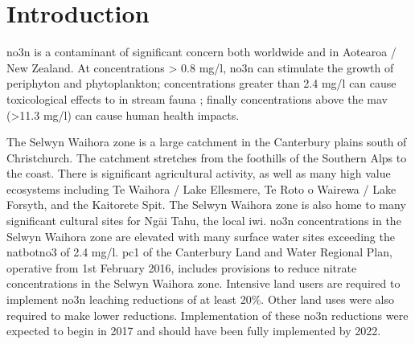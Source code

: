 
\section[Introduction]{Introduction} \label{sec:intro}

\gls{no3n} is a contaminant of significant concern both worldwide and in Aotearoa / New Zealand.
At concentrations > 0.8 mg/l, \gls{no3n} can stimulate the growth of periphyton and phytoplankton\citep{mcdowell_global_2020}; concentrations greater than 2.4 mg/l can cause toxicological effects to in stream fauna
\citep{camargo_nitrate_2005, horak_assessing_2019,wagenhoff_identifying_2017};
finally concentrations above the \gls{mav} (>11.3 mg/l) can cause human health impacts\citep{rahman_anthropogenic_2021}.

The Selwyn Waihora zone is a large catchment in the Canterbury plains south of Christchurch.
The catchment stretches from the foothills of the Southern Alps to the coast.
There is significant agricultural activity, as well as many high value ecosystems including Te Waihora / Lake Ellesmere, Te Roto o Wairewa / Lake Forsyth, and the Kaitorete Spit.
The Selwyn Waihora zone is also home to many significant cultural sites for Ngāi Tahu, the local iwi.
\gls{no3n} concentrations in the Selwyn Waihora zone are elevated with many surface water sites exceeding the \gls{natbotno3} of 2.4 mg/l\citep{noauthor_national_2020}.
\gls{pc1} of the Canterbury Land and Water Regional Plan, operative from 1st February 2016, includes provisions to reduce nitrate concentrations in the Selwyn Waihora zone.
Intensive land users are required to implement \gls{no3n} leaching reductions of at least 20\%.
Other land uses were also required to make lower reductions. Implementation of these \gls{no3n} reductions were expected to begin in 2017 and should have been fully implemented by 2022.

